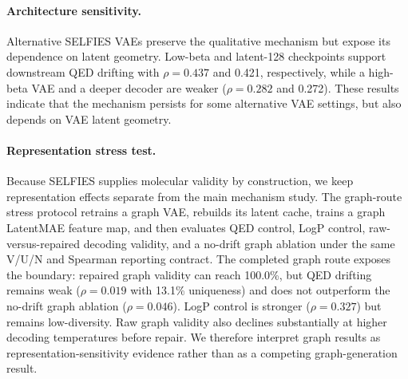 \documentclass[letterpaper]{article}
\begin{document}
\begin{table}[t]
\centering
\caption{Implementation-sensitivity checks. Values are single-seed QED audit
results; $\rho$ is Spearman correlation and U is uniqueness.}
\label{tab:impl-checks}
\end{table}

\paragraph{Architecture sensitivity.}
Alternative SELFIES VAEs preserve the qualitative mechanism but expose its
dependence on latent geometry. Low-beta and latent-128 checkpoints support
downstream QED drifting with $\rho=0.437$ and 0.421, respectively, while a
high-beta VAE and a deeper decoder are weaker ($\rho=0.282$ and 0.272). These
results indicate that the mechanism persists for some alternative VAE settings,
but also depends on VAE latent geometry.

\paragraph{Representation stress test.}
Because SELFIES supplies molecular validity by construction, we keep
representation effects separate from the main mechanism study. The graph-route
stress protocol retrains a graph VAE, rebuilds its latent cache, trains a graph
LatentMAE feature map, and then evaluates QED control, LogP control,
raw-versus-repaired decoding validity, and a no-drift graph ablation under the
same V/U/N and Spearman reporting contract. The completed graph route exposes
the boundary: repaired graph validity can reach 100.0\%, but QED drifting
remains weak ($\rho=0.019$ with 13.1\% uniqueness) and does not outperform the
no-drift graph ablation ($\rho=0.046$). LogP control is stronger
($\rho=0.327$) but remains low-diversity. Raw graph validity also declines
substantially at higher decoding temperatures before repair. We therefore
interpret graph results as representation-sensitivity evidence rather than as a
competing graph-generation result.
\end{document}
